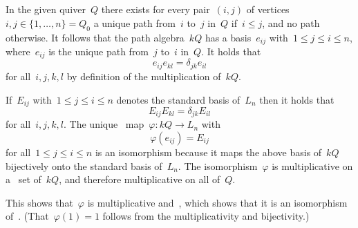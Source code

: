 \section{}

In the given quiver~$Q$ there exists for every pair~$(i,j)$ of vertices~$i,j \in \{1, \dotsc, n\} = Q_0$ a unique path from~$i$ to~$j$ in~$Q$ if~$i \leq j$, and no path otherwise.
It follows that the path algebra~$kQ$ has a basis~$e_{ij}$ with~$1 \leq j \leq i \leq n$, where~$e_{ij}$ is the unique path from~$j$ to~$i$ in~$Q$.
It holds that
\[
    e_{ij} e_{kl}
  = \delta_{jk} e_{il}
\]
for all~$i,j,k,l$ by definition of the multiplication of~$kQ$.

If~$E_{ij}$ with~$1 \leq j \leq i \leq n$ denotes the standard basis of~$L_n$ then it holds that
\[
    E_{ij} E_{kl}
  = \delta_{jk} E_{il}
\]
for all~$i,j,k,l$.
The unique~{\klin} map~$\varphi \colon kQ \to L_n$ with~
\[
    \varphi(e_{ij})
  = E_{ij}
\]
for all~$1 \leq j \leq i \leq n$ is an isomorphism because it maps the above basis of~$kQ$ bijectively onto the standard basis of~$L_n$.
The isomorphism~$\varphi$ is multiplicative on a~ set of~$kQ$, and therefore multiplicative on all of~$Q$.

This shows that~$\varphi$ is multiplicative and~{\klin}, which shows that it is an isomorphism of~{\kalgs}.
(That~$\varphi(1) = 1$ follows from the multiplicativity and bijectivity.)




